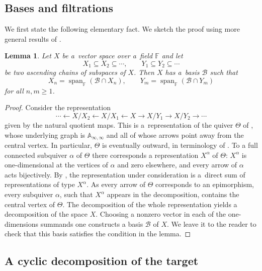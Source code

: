 \documentclass[11pt]{article}
\newtheorem{lem}[thm]{Lemma}
\theoremstyle{definition}
\begin{document}
\subsection{Bases and filtrations}

We first state  the following elementary fact.
We sketch the proof using more general results of \cite{gallup-sawin}.



\begin{lem}\label{lem:two-filtrations}
	Let $X$ be a~vector space over a~field $\mathbb F$ and let
	$$
	X_1\subseteq X_2\subseteq\cdots,\qquad
	Y_1\subseteq Y_2\subseteq\cdots
	$$
	be two ascending chains of subspaces of $X$.
	Then $X$ has a~basis $\mathcal B$ such that
	$$
	X_n=\operatorname{span}_{\mathbb F}(\mathcal B\cap X_n),
	\qquad
	Y_m=\operatorname{span}_{\mathbb F}(\mathcal B\cap Y_m)
	$$
	for all $n,m\geq1$.
\end{lem}

\begin{proof}
	Consider the representation
	\[
	\cdots\longleftarrow X/X_2\longleftarrow X/X_1
	\longleftarrow X
	\longrightarrow X/Y_1\longrightarrow X/Y_2\longrightarrow\cdots
	\]
	given by the natural quotient maps. This is a~representation of
	the quiver $\Theta$ of \cite[Example~1]{gallup-sawin}, whose
	underlying graph is $\mathbb{A}_{\infty,\infty}$ and all of whose
	arrows point away from the central vertex. In particular, $\Theta$
	is eventually outward, in terminology of \cite{gallup-sawin}. To a full connected subquiver $\alpha$ of $\Theta$ there corresponds a representation $X^{\alpha}$ of $\Theta$: $X^\alpha$ is one-dimensional at the vertices of $\alpha$ and zero
	elsewhere, and every arrow of $\alpha$ acts bijectively.
	By \cite[Theorem~1 and Proposition~7.1]{gallup-sawin},
	 the representation under consideration is a~direct sum of representations of type $X^\alpha$. As every arrow of $\Theta$ corresponds to an epimorphism, every subquiver $\alpha$, such that $X^{\alpha}$ appears in the decomposition, contains the central vertex of $\Theta$. The decomposition of the whole representation yields a decomposition of the space $X$. Choosing a nonzero vector in each of the one-dimensions summands one constructs a basis $\mathcal B$ of $X$. We leave it to the reader to check that this basis satisfies the condition in the lemma. 
\end{proof}




\subsection{A cyclic decomposition of the target}
\end{document}
